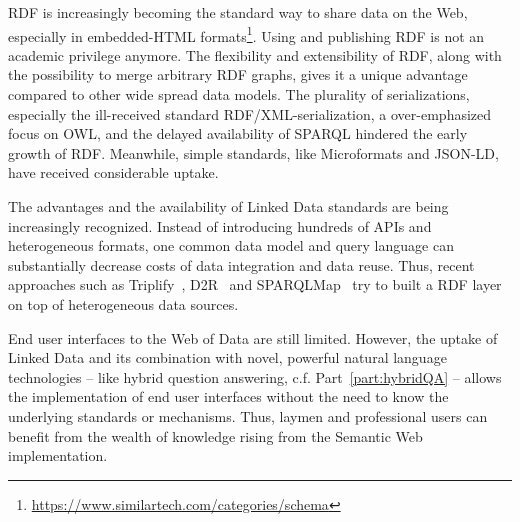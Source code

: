 \ac{RDF} is increasingly becoming the standard way to share data on the Web, especially in embedded-HTML formats\footnote{\url{https://www.similartech.com/categories/schema}}.
Using and publishing \ac{RDF} is not an academic privilege anymore.
The flexibility and extensibility of \ac{RDF}, along with the possibility to merge arbitrary \ac{RDF} graphs, gives it a unique advantage compared to other wide spread data models.
The plurality of serializations, especially the ill-received standard RDF/XML-serialization, a over-emphasized focus on OWL, and the delayed availability of SPARQL hindered the early growth of \ac{RDF}.
Meanwhile, simple standards, like Microformats and JSON-LD, have received considerable uptake.

The advantages and the availability of Linked Data standards are being increasingly recognized.
Instead of introducing hundreds of APIs and heterogeneous formats, one common data model and query language can substantially decrease costs of data integration and data reuse.
Thus, recent approaches such as Triplify~\cite{triplify_www}, D2R~\cite{Bizer04} and SPARQLMap~\cite{unbehauen-jist-2012-sparqlmap} try to built a \ac{RDF} layer on top of heterogeneous data sources.

End user interfaces to the Web of Data are still limited.
However, the uptake of Linked Data and its combination with novel, powerful natural language technologies -- like hybrid question answering, c.f. Part~\ref{part:hybridQA} -- allows the implementation of end user interfaces without the need to know the underlying standards or mechanisms.
Thus, laymen and professional users can benefit from the wealth of knowledge rising from the Semantic Web implementation.

